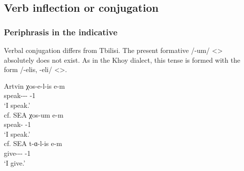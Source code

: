 \subsection{Verb inflection or conjugation}

\subsubsection{Periphrasis in the indicative}
Verbal conjugation differs from Tbilisi. The present formative /-um/ <> absolutely does not exist. As in the Khoy dialect, this tense is formed with the form /-elis, -eli/ <>.


\begin{exe}
	\ex \label{sent:Artvin:morpho:verb:impf}
	\begin{xlist}
		\ex Artvin 
		\gll χos-e-l-is e-m \\
		speak-{\thgloss}-{\infgloss}-{\impfcvb} {\aux}-1{\sg} \\
		\trans `I speak.'\\
		\ex cf. SEA 
		\gll χos-um e-m \\
		speak-{\impfcvb} {\aux}-1{\sg} \\
		\trans `I speak.'\\
		\ex cf. SEA 
		\gll t-ɑ-l-is e-m \\
		give-{\thgloss}-{\infgloss}-{\impfcvb} {\aux}-1{\sg} \\
		\trans `I give.'\\
	\end{xlist}
\end{exe}


